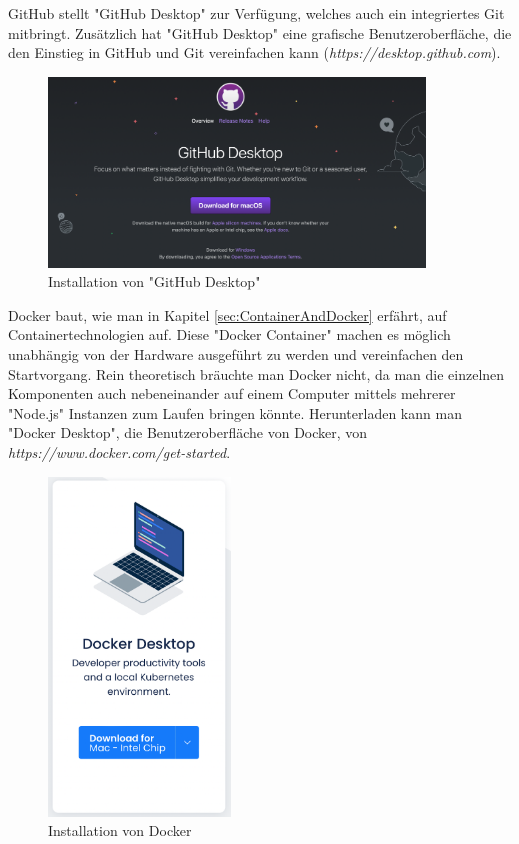GitHub stellt "GitHub Desktop" zur Verfügung, welches auch ein integriertes Git mitbringt. Zusätzlich hat "GitHub Desktop" eine grafische  Benutzeroberfläche, die den Einstieg in GitHub und Git vereinfachen kann (\emph{https://desktop.github.com}). 

\begin{figure}[H]
    \centering
    \includegraphics[width=100mm]{media/Handbuch/github_desktop.png}
    \caption{Installation von "GitHub Desktop"}
    \label{fig:githubdesktop}
\end{figure}


Docker baut, wie man in Kapitel \ref{sec:ContainerAndDocker} erfährt, auf Containertechnologien auf. Diese "Docker Container" machen es möglich unabhängig von der Hardware ausgeführt zu werden und vereinfachen den Startvorgang. Rein theoretisch bräuchte man Docker nicht, da man die einzelnen Komponenten auch nebeneinander auf einem Computer mittels mehrerer "Node.js" Instanzen zum Laufen bringen könnte. Herunterladen kann man "Docker Desktop", die Benutzeroberfläche von Docker, von \emph{https://www.docker.com/get-started}.

\begin{figure}[H]
    \centering
    \includegraphics[height=90mm]{media/Handbuch/dockerdesktop.png}
    \caption{Installation von Docker}
\end{figure}


